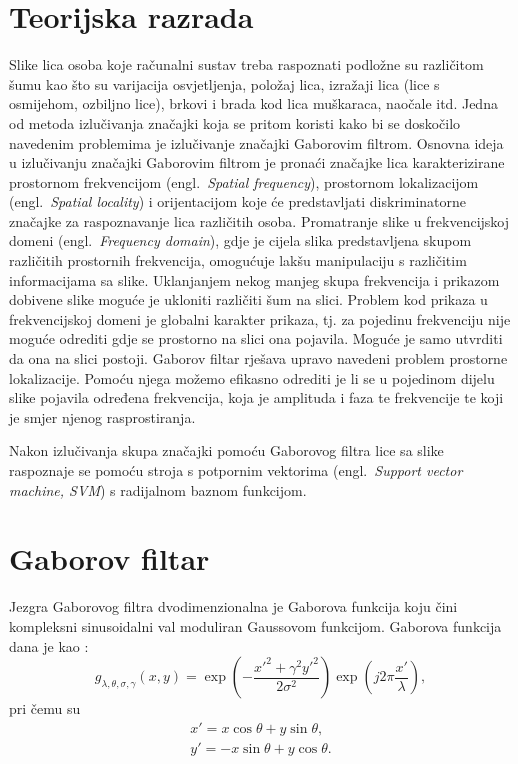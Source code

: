 \documentclass[12pt,a4paper]{ReportAA}
\newcommand{\engl}[1]{(engl.~\emph{#1})}
\begin{document}
\chapter{Teorijska razrada}
Slike lica osoba koje računalni sustav treba raspoznati podložne su različitom
šumu kao što su varijacija osvjetljenja, položaj lica, izražaji lica (lice s
osmijehom, ozbiljno lice), brkovi i brada kod lica muškaraca, naočale itd. Jedna
od metoda izlučivanja značajki koja se pritom koristi kako bi se doskočilo
navedenim problemima je izlučivanje značajki Gaborovim filtrom. Osnovna ideja u
izlučivanju značajki Gaborovim filtrom je pronaći značajke lica karakterizirane
prostornom frekvencijom \engl{Spatial frequency}, prostornom lokalizacijom
\engl{Spatial locality} i orijentacijom koje će predstavljati diskriminatorne
značajke za raspoznavanje lica različitih osoba. Promatranje slike u
frekvencijskoj domeni \engl{Frequency domain}, gdje je cijela slika predstavljena
skupom različitih prostornih frekvencija, omogućuje lakšu manipulaciju s
različitim informacijama sa slike. Uklanjanjem nekog manjeg skupa frekvencija i
prikazom dobivene slike moguće je ukloniti različiti šum na slici. Problem kod
prikaza u frekvencijskoj domeni je globalni karakter prikaza, tj. za
pojedinu frekvenciju nije moguće odrediti gdje se prostorno na slici ona pojavila.
Moguće je samo utvrditi da ona na slici postoji. Gaborov filtar rješava
upravo navedeni problem prostorne lokalizacije. Pomoću njega možemo efikasno
odrediti je li se u pojedinom dijelu slike pojavila određena frekvencija, koja
je amplituda i faza te frekvencije te koji je smjer njenog rasprostiranja.

Nakon izlučivanja skupa značajki pomoću Gaborovog filtra lice sa slike raspoznaje
se pomoću stroja s potpornim vektorima \engl{Support vector machine,
SVM} s radijalnom baznom funkcijom.

\chapter{Gaborov filtar}

Jezgra Gaborovog filtra dvodimenzionalna je Gaborova funkcija koju čini
kompleksni sinusoidalni val moduliran Gaussovom funkcijom. Gaborova funkcija
dana je kao \citep{petkovgabor}:
\begin{equation}
g_{\lambda,\theta,\sigma,\gamma}(x,y) = \exp\left ( -
\frac{x'^2+\gamma^2 y'^2}{2\sigma^2}\right ) \exp \left ( j2\pi
\frac{x'}{\lambda} \right ),
\label{2d-gabor}
\end{equation}
pri čemu su
\begin{eqnarray*}
x' = x \cos \theta + y \sin \theta, \\
y' = -x \sin \theta + y \cos \theta.
\end{eqnarray*}
\end{document}
